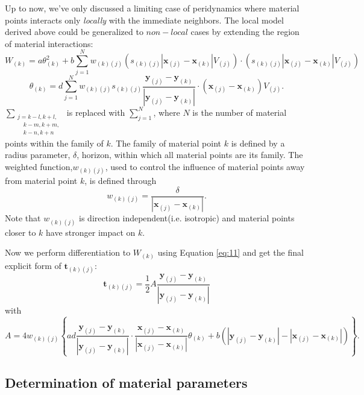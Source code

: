 \documentclass[11pt,fullpage]{article}
\newcommand{\mb}[1]{\mathbf{#1}}
\newcommand{\blue}[1]{#1}
\begin{document}
Up to now, we've only discussed a limiting case of peridynamics where material points interacts only \emph{locally} with the immediate neighbors. The local model derived above could be generalized to $non-local$ cases by extending the region of material interactions:
\begin{equation}
W_{(k)} = a\theta_{(k)}^2 + b\sum_{j=1}^{N}w_{(k)(j)}(s_{(k)(j)}|\mb{x}_{(j)}-\mb{x}_{(k)}|V_{(j)})\cdot(s_{(k)(j)}|\mb{x}_{(j)}-\mb{x}_{(k)}|V_{(j)})
\label{eq:26}
\end{equation}
\begin{equation}
\theta_{(k)} = d\sum_{j=1}^{N}w_{(k)(j)}s_{(k)(j)}\frac{\mb{y}_{(j)} - \mb{y}_{(k)}}{|\mb{y}_{(j)} - \mb{y}_{(k)}|}\cdot(\mb{x}_{(j)}-\mb{x}_{(k)})V_{(j)}.
\label{eq:27}
\end{equation}
$\sum_{\substack {j=k-l,k+l,\\ \quad k-m,k+m,\\ \quad k-n,k+n}}$ is replaced with $\sum_{j=1}^{N}$, where $N$ is the number of material points within the family of $k$. The family of material point $k$ is defined by a radius parameter, $\delta$, horizon, within which all material points are its family. The weighted function,$w_{(k)(j)}$, used to control the influence of material points away from material point $k$, is  defined through
\begin{equation}
w_{(k)(j)} = \frac{\delta}{|\mb{x}_{(j)}-\mb{x}_{(k)}|}.
\label{eq:28}
\end{equation}
Note that $w_{(k)(j)}$ is direction independent(i.e. isotropic) and material points closer to $k$ have stronger impact on $k$.

Now we perform differentiation to $W_{(k)}$ using Equation \blue{\ref{eq:11}} and get the final explicit form of $\mb{t}_{(k)(j)}$:
\begin{equation}
\mb{t}_{(k)(j)} = \frac{1}{2}A\frac{\mb{y}_{(j)} - \mb{y}_{(k)}}{|\mb{y}_{(j)} - \mb{y}_{(k)}|}
\label{eq:29}
\end{equation}
with
\begin{equation}
A = 4w_{(k)(j)}\left\{ad\frac{\mb{y}_{(j)} - \mb{y}_{(k)}}{|\mb{y}_{(j)} - \mb{y}_{(k)}|}\cdot\frac{\mb{x}_{(j)} - \mb{x}_{(k)}}{|\mb{x}_{(j)} - \mb{x}_{(k)}|}\theta_{(k)}
   +b\left(|\mb{y}_{(j)} - \mb{y}_{(k)}| - |\mb{x}_{(j)} - \mb{x}_{(k)}|\right) \right\}.
\label{eq:30}
\end{equation}

\subsection{Determination of material parameters}
\end{document}

